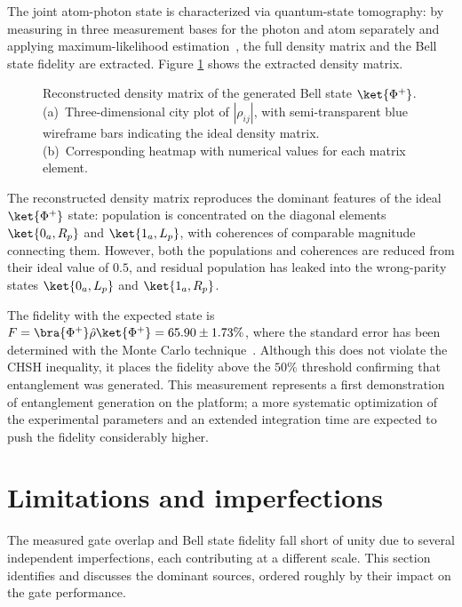 The joint atom-photon state is characterized via quantum-state tomography: by measuring in three measurement bases for the photon and atom separately and applying maximum-likelihood estimation~\cite{Paris2004,Maximum-Likelihood_technique}, the full density matrix and the Bell state fidelity are extracted. Figure \ref{fig:bs_state} shows the extracted density matrix.

\begin{figure}[htbp]
	\centering
	\makebox[\linewidth][c]{%
		
	}
	\caption{Reconstructed density matrix of the generated Bell state $\ket{\Phi^+}$.
		(a)~Three-dimensional city plot of $|\rho_{ij}|$, with semi-transparent blue wireframe bars indicating the ideal density matrix.
		(b)~Corresponding heatmap with numerical values for each matrix element.}
	\label{fig:bs_state}
\end{figure}

The reconstructed density matrix reproduces the dominant features of the ideal $\ket{\Phi^+}$ state: population is concentrated on the diagonal elements $\ket{0_a, R_p}$ and $\ket{1_a, L_p}$, with coherences of comparable magnitude connecting them. However, both the populations and coherences are reduced from their ideal value of $0.5$, and residual population has leaked into the wrong-parity states $\ket{0_a, L_p}$ and $\ket{1_a, R_p}$.

The fidelity with the expected state is $F=\bra{\Phi^+}\hat{\rho}\ket{\Phi^+}=65.90\pm1.73\%$, where the standard error has been determined with the Monte Carlo technique~\cite{Paris2004}. Although this does not violate the CHSH inequality, it places the fidelity above the $50\%$ threshold confirming that entanglement was generated. This measurement represents a first demonstration of entanglement generation on the platform; a more systematic optimization of the experimental parameters and an extended integration time are expected to push the fidelity considerably higher.

\section{Limitations and imperfections}\label{sec:imperfections}
The measured gate overlap and Bell state fidelity fall short of unity due to several independent imperfections, each contributing at a different scale. This section identifies and discusses the dominant sources, ordered roughly by their impact on the gate performance.


